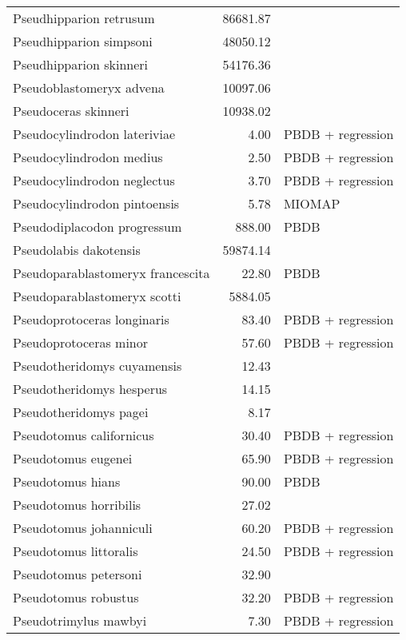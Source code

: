 \begin{table}[ht]
\begin{tabular}{lrl}
  Pseudhipparion retrusum & 86681.87 & \cite{Tomiya2013} \\ 
  Pseudhipparion simpsoni & 48050.12 & \cite{Tomiya2013} \\ 
  Pseudhipparion skinneri & 54176.36 & \cite{Tomiya2013} \\ 
  Pseudoblastomeryx advena & 10097.06 & \cite{Tomiya2013} \\ 
  Pseudoceras skinneri & 10938.02 & \cite{Tomiya2013} \\ 
  Pseudocylindrodon lateriviae & 4.00 & PBDB + regression \\ 
  Pseudocylindrodon medius & 2.50 & PBDB + regression \\ 
  Pseudocylindrodon neglectus & 3.70 & PBDB + regression \\ 
  Pseudocylindrodon pintoensis & 5.78 & MIOMAP \\ 
  Pseudodiplacodon progressum & 888.00 & PBDB \\ 
  Pseudolabis dakotensis & 59874.14 & \cite{Tomiya2013} \\ 
  Pseudoparablastomeryx francescita & 22.80 & PBDB \\ 
  Pseudoparablastomeryx scotti & 5884.05 & \cite{Tomiya2013} \\ 
  Pseudoprotoceras longinaris & 83.40 & PBDB + regression \\ 
  Pseudoprotoceras minor & 57.60 & PBDB + regression \\ 
  Pseudotheridomys cuyamensis & 12.43 & \cite{Tomiya2013} \\ 
  Pseudotheridomys hesperus & 14.15 & \cite{Tomiya2013} \\ 
  Pseudotheridomys pagei & 8.17 & \cite{Tomiya2013} \\ 
  Pseudotomus californicus & 30.40 & PBDB + regression \\ 
  Pseudotomus eugenei & 65.90 & PBDB + regression \\ 
  Pseudotomus hians & 90.00 & PBDB \\ 
  Pseudotomus horribilis & 27.02 & \cite{Carraway2010} \\ 
  Pseudotomus johanniculi & 60.20 & PBDB + regression \\ 
  Pseudotomus littoralis & 24.50 & PBDB + regression \\ 
  Pseudotomus petersoni & 32.90 & \cite{Carraway2010} \\ 
  Pseudotomus robustus & 32.20 & PBDB + regression \\ 
  Pseudotrimylus mawbyi & 7.30 & PBDB + regression \\ 

\end{tabular}
\end{table}
